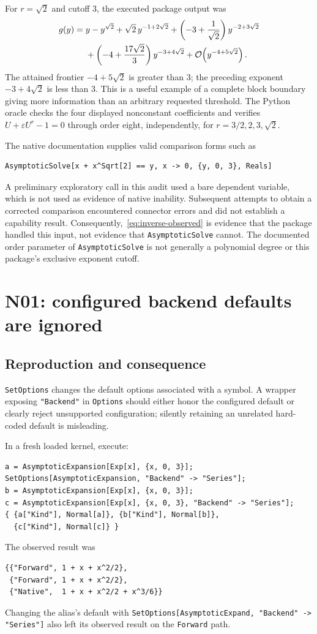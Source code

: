 \documentclass[11pt]{article}
\newcommand{\code}[1]{\texttt{#1}}
\newcommand{\q}{\sqrt{2}}
\newcommand{\Oh}{\mathcal O}
\begin{document}
For $r=\q$ and cutoff $3$, the executed package output was
\begin{align}
 g(y)={}&y-y^{\q}+\q\,y^{-1+2\q}
       +\left(-3+\frac{1}{\q}\right)y^{-2+3\q}\notag\\
       &+\left(-4+\frac{17\q}{3}\right)y^{-3+4\q}
       +\Oh\!\left(y^{-4+5\q}\right).
 \label{eq:inverse-observed}
\end{align}
The attained frontier $-4+5\q$ is greater than $3$; the preceding exponent $-3+4\q$ is less than $3$. This is a useful example of a complete block boundary giving more information than an arbitrary requested threshold. The Python oracle checks the four displayed nonconstant coefficients and verifies
$U+\varepsilon U^r-1=0$ through order eight, independently, for $r=3/2,2,3,\q$.

The native documentation supplies valid comparison forms such as
\begin{lstlisting}
AsymptoticSolve[x + x^Sqrt[2] == y, x -> 0, {y, 0, 3}, Reals]
\end{lstlisting}
A preliminary exploratory call in this audit used a bare dependent variable, which is not used as evidence of native inability. Subsequent attempts to obtain a corrected comparison encountered connector errors and did not establish a capability result. Consequently,~\eqref{eq:inverse-observed} is evidence that the package handled this input, not evidence that \code{AsymptoticSolve} cannot. The documented order parameter of \code{AsymptoticSolve} is not generally a polynomial degree or this package's exclusive exponent cutoff.\cite{wlsolve}

\section{N01: configured backend defaults are ignored}
\label{sec:n01}
\subsection{Reproduction and consequence}
\code{SetOptions} changes the default options associated with a symbol. A wrapper exposing \code{"Backend"} in \code{Options} should either honor the configured default or clearly reject unsupported configuration; silently retaining an unrelated hard-coded default is misleading.\cite{wlsetoptions}

In a fresh loaded kernel, execute:
\begin{lstlisting}
a = AsymptoticExpansion[Exp[x], {x, 0, 3}];
SetOptions[AsymptoticExpansion, "Backend" -> "Series"];
b = AsymptoticExpansion[Exp[x], {x, 0, 3}];
c = AsymptoticExpansion[Exp[x], {x, 0, 3}, "Backend" -> "Series"];
{ {a["Kind"], Normal[a]}, {b["Kind"], Normal[b]},
  {c["Kind"], Normal[c]} }
\end{lstlisting}
The observed result was
\begin{lstlisting}
{{"Forward", 1 + x + x^2/2},
 {"Forward", 1 + x + x^2/2},
 {"Native",  1 + x + x^2/2 + x^3/6}}
\end{lstlisting}
Changing the alias's default with
\code{SetOptions[AsymptoticExpand, "Backend" -> "Series"]}
also left its observed result on the \code{Forward} path.
\end{document}
